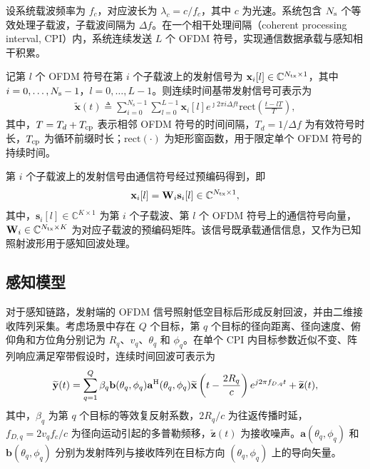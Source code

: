 \documentclass[onecolumn,10pt]{IEEEtran}
\begin{document}
设系统载波频率为 $f_c$，对应波长为 $\lambda_c=c/f_c$，其中 $c$ 为光速。系统包含 $N_{\rm s}$ 个等效处理子载波，子载波间隔为 $\Delta f$。在一个相干处理间隔（coherent processing interval, CPI）内，系统连续发送 $L$ 个 OFDM 符号，实现通信数据承载与感知相干积累。

记第 $l$ 个 OFDM 符号在第 $i$ 个子载波上的发射信号为
$\mathbf{x}_i[l]\in\mathbb{C}^{N_{\rm tx}\times 1}$，其中
$i=0,\ldots,N_{\rm s}-1$，$l=0,\ldots,L-1$。则连续时间基带发射信号可表示为
\begin{align} \label{transmitted signal} 
		\widetilde{\mathbf{x}}(t)\triangleq 
        \sum_{i=0}^{N_\mathrm{s}-1} 
        \sum_{l=0}^{L-1} 
        \mathbf{x}_i[l] e^{\jmath 2\pi i \Delta f t} 
        \mathrm{rect} \left(\frac{t-l T}{T} \right),
\end{align}
其中，$T=T_d+T_{\rm cp}$ 表示相邻 OFDM 符号的时间间隔，$T_d=1/\Delta f$ 为有效符号时长，$T_{\rm cp}$ 为循环前缀时长；$\mathrm{rect}(\cdot)$ 为矩形窗函数，用于限定单个 OFDM 符号的持续时间。


第 $i$ 个子载波上的发射信号由通信符号经过预编码得到，即
\begin{align}
    \mathbf{x}_i[l] = \mathbf{W}_i \mathbf{s}_i[l]\in \mathbb{C}^{ N_{\rm tx}\times 1 },
\end{align}
其中，$\mathbf{s}_i[l]\in \mathbb{C}^{K\times 1}$ 为第 $i$ 个子载波、第 $l$ 个 OFDM 符号上的通信符号向量，$\mathbf{W}_i\in \mathbb{C}^{N_{\rm tx}\times K}$ 为对应子载波的预编码矩阵。该信号既承载通信信息，又作为已知照射波形用于感知回波处理。


\subsection{感知模型}

对于感知链路，发射端的 OFDM 信号照射低空目标后形成反射回波，并由二维接收阵列采集。考虑场景中存在 $Q$ 个目标，第 $q$ 个目标的径向距离、径向速度、俯仰角和方位角分别记为 $R_q$、$v_q$、$\theta_q$ 和 $\phi_q$。在单个 CPI 内目标参数近似不变、阵列响应满足窄带假设时，连续时间回波可表示为
\begin{align}
\widetilde{\mathbf{y}}(t) = \sum_{q=1}^{Q} \beta_q \mathbf{b}(\theta_q,\phi_q) \mathbf{a}^{\rm H}(\theta_q,\phi_q) \widetilde{\mathbf{x}}\left(t-\frac{2R_q}{c}\right) e^{j2\pi f_{D,q}t} + \widetilde{\mathbf{z}}(t),
\end{align}
其中，$\beta_q$ 为第 $q$ 个目标的等效复反射系数，$2R_q/c$ 为往返传播时延，$f_{D,q}=2v_qf_c/c$ 为径向运动引起的多普勒频移，$\widetilde{\mathbf{z}}(t)$ 为接收噪声。$\mathbf{a}(\theta_q,\phi_q)$ 和 $\mathbf{b}(\theta_q,\phi_q)$ 分别为发射阵列与接收阵列在目标方向 $(\theta_q,\phi_q)$ 上的导向矢量。
\end{document}
